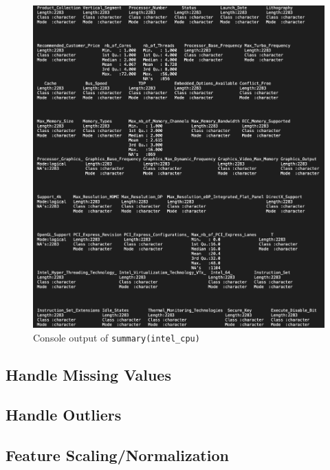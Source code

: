 \begin{figure}[H]
    \centering
    \includegraphics[width=14cm]{graphics/summary.png}
    \caption*{Console output of \texttt{summary(intel\_cpu)}}
\end{figure}

\subsection{Handle Missing Values}

\subsection{Handle Outliers}

\subsection{Feature Scaling/Normalization}

\newpage